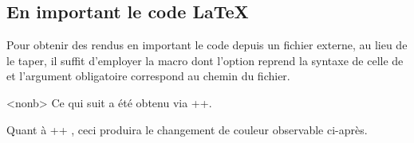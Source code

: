 \documentclass[12pt, a4paper]{article}
\begin{document}
\subsection{En important le code \LaTeX}

Pour obtenir des rendus en important le code depuis un fichier externe, au lieu de le taper, il suffit d'employer la macro  dont l'option reprend la syntaxe de celle de  et l'argument obligatoire correspond au chemin du fichier.


\begin{tdocexa}<nonb>
    Ce qui suit a été obtenu via \tdocinlatex++.

    \medskip


    \medskip

    Quant à \tdocinlatex++ , ceci produira le changement de couleur observable ci-après.

    \medskip

\end{tdocexa}
\end{document}
